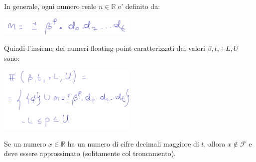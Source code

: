 \documentclass{report}
\begin{document}
In generale, ogni numero reale $ n \in \mathbb{R} $ e' definito da:
\begin{center}
  \includegraphics[width=0.5\textwidth]{img/2024-09-16-14-03-42.png}
\end{center}

Quindi l'insieme dei numeri floating point caratterizzati dai valori $ \beta, t, +L, U $ sono:
\begin{center}
  \includegraphics[width=0.5\textwidth]{img/2024-09-16-14-09-02.png}
\end{center}

Se un numero $ x \in \mathbb{R} $ ha un numero di cifre decimali maggiore di $ t $, allora $ x \not\in \mathcal{F} $ e deve essere approssimato (solitamente col troncamento).
\end{document}

